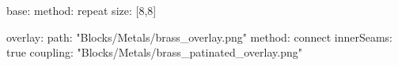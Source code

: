 base:
  method: repeat
  size: [8,8]
  
overlay:
  path: "Blocks/Metals/brass_overlay.png"
  method: connect
  innerSeams: true
  coupling: "Blocks/Metals/brass_patinated_overlay.png"